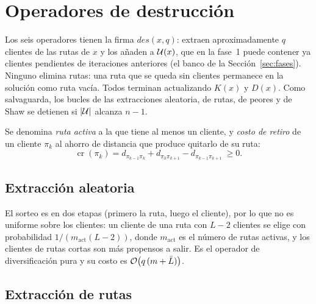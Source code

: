 \section{Operadores de destrucción}
\label{sec:destruccion}

Los seis operadores tienen la firma $\textit{des}(x,q)$: extraen aproximadamente $q$
clientes de las rutas de $x$ y los añaden a $\mathcal{U}(x)$, que en la fase~1 puede contener ya
clientes pendientes de iteraciones anteriores (el banco de la Sección~\ref{sec:fases}). Ninguno
elimina rutas: una ruta que se queda sin clientes permanece en la solución como ruta vacía.
Todos terminan actualizando $K(x)$ y $D(x)$. Como salvaguarda, los bucles de las extracciones
aleatoria, de rutas, de peores y de Shaw se detienen si $|\mathcal{U}|$ alcanza $n-1$.

Se denomina \emph{ruta activa} a la que tiene al menos un cliente, y \emph{costo de retiro} de
un cliente $\pi_k$ al ahorro de distancia que produce quitarlo de su ruta:
\begin{equation}
\operatorname{cr}(\pi_k)=d_{\pi_{k-1}\pi_k}+d_{\pi_k\pi_{k+1}}-d_{\pi_{k-1}\pi_{k+1}}\ \ge 0 .
\label{eq:cr}
\end{equation}

\subsection{Extracción aleatoria}

\begin{algorithm}[H]
\caption{ ()}
\label{alg:random}
\end{algorithm}

El sorteo es en dos etapas (primero la ruta, luego el cliente), por lo que no es uniforme
sobre los clientes: un cliente de una ruta con $L-2$ clientes se elige con probabilidad
$1/(m_{\mathrm{act}}(L-2))$, donde $m_{\mathrm{act}}$ es el número de rutas activas, y los
clientes de rutas cortas son más propensos a salir. Es el operador de diversificación pura y
su costo es
$\mathcal{O}\bigl(q\,(m+\bar{L})\bigr)$.

\subsection{Extracción de rutas}

